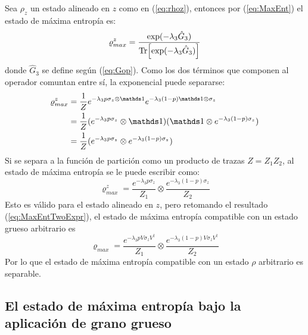 Sea $\rho_{z}$ un estado alineado en $z$ como en (\ref{eq:rhoz}), entonces por (\ref{eq:MaxEnt}) el estado de máxima entropía es:
\begin{equation}\label{eq:MaxEntUgly}
\varrho_{max}^{z}=\frac{\text{exp}(-\lambda_{3}\hat{G}_{3})}{\Tr[\text{exp}(-\lambda_{3}\hat{G}_{3})]}
\end{equation}
donde $\hat{G}_{3}$ se define según (\ref{eq:Gop}). Como los dos términos que componen al operador comuntan entre sí, la exponencial puede separarse:
\begin{align*}
\varrho_{max}^{z}&=\frac{1}{Z}e^{-\lambda_{3}p\sigma_{z}\otimes\Id}e^{-\lambda_{3}(1-p)\Id\otimes\sigma_{z}}\\
&=\frac{1}{Z}(e^{-\lambda_{3}p\sigma_{z}}\otimes\Id)( \Id\otimes e^{-\lambda_{3}(1-p)\sigma_{z}})\\
&=\frac{1}{Z}(e^{-\lambda_{3}p\sigma_{z}}\otimes e^{-\lambda_{3}(1-p)\sigma_{z}})\\
\end{align*}
Si se separa a la función de partición como un producto de trazas $Z=Z_{1}Z_{2}$, al estado de máxima entropía se le puede escribir como:
\begin{equation}\label{eq:MaxEntZ}
\varrho_{max}^{z}=\frac{e^{-\lambda_{3}p\sigma_{z}}}{Z_{1}} \otimes \frac{e^{-\lambda_{3}(1-p)\sigma_{z}}}{Z_{2}}
\end{equation}
Esto es válido para el estado alineado en $z$, pero retomando el resultado (\ref{eq:MaxEntTwoExpr}), el estado de máxima entropía compatible con un estado grueso arbitrario es
\begin{equation}\label{eq:MaxEntSeparable}
  \boxed{\varrho_{max}=\frac{e^{-\lambda_{3}pV\sigma_{z}V^{\dag}}}{Z_{1}} \otimes \frac{e^{-\lambda_{3}(1-p)V\sigma_{z}V^{\dag}}}{Z_{2}}}
\end{equation}
Por lo que el estado de máxima entropía compatible con un estado $\rho$ arbitrario es separable.

\subsection{El estado de máxima entropía bajo la aplicación de grano grueso}\label{sec:CG(MaxEnt)}

